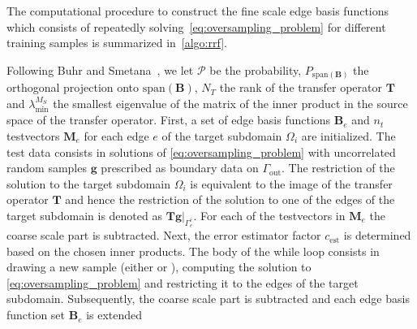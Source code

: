 \documentclass[AMA,STIX1COL,doublespace]{WileyNJD-v2}
\begin{document}
The computational procedure to construct the fine scale edge basis functions
which consists of repeatedly solving~\cref{eq:oversampling_problem} for different
training samples is summarized in~\cref{algo:rrf}.

Following Buhr and Smetana~\cite{BS2018}, we let $\mathcal{P}$ be the probability, $P_{\mathrm{span}(\bm{B})}$ the orthogonal projection onto $\mathrm{span}(\bm{B})$, $N_{T}$ the rank of the transfer operator $\bm{T}$ and $\lambda^{M_S}_{\mathrm{min}}$ the smallest eigenvalue of the matrix of the inner product in the source space of the transfer operator.
First, a set of edge basis functions $\bm{B}_e$ and $n_t$ testvectors $\bm{M}_e$
for each edge $e$ of the target subdomain $\varOmega_i$ are initialized.
The test data consists in solutions of \cref{eq:oversampling_problem}
with uncorrelated random samples $\bm{g}$  prescribed as boundary data
on $\varGamma_{\mathrm{out}}$.
The restriction of the solution to the target subdomain $\varOmega_i$ is equivalent
to the image of the transfer operator $\bm{T}$ and hence the restriction
of the solution to one of the edges of the target subdomain is
denoted as $\bm{T}\bm{g}\vert_{\varGamma_e^i}$.
For each of the testvectors in $\bm{M}_e$ the coarse scale part is subtracted.
Next, the error estimator factor $c_{\mathrm{est}}$ is determined
based on the chosen inner products.
The body of the while loop consists in drawing a new sample
 (either  or ), computing the solution to \cref{eq:oversampling_problem}
and restricting it to the edges of the target subdomain.
Subsequently, the coarse scale part is subtracted and each edge basis function
set $\bm{B}_e$ is extended 
\end{document}
